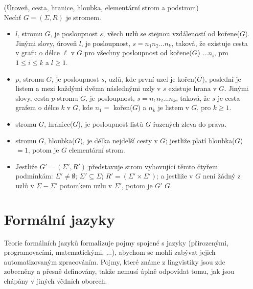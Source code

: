 \begin{defn}
  (Úroveň, cesta, hranice, hloubka, elementární strom a podstrom)\\
  Nechť $G = (\Sigma, R)$ je stromem.
  \begin{itemize}
    \item {} $l$, stromu $G$, je posloupnost $s$,
      všech uzlů se stejnou vzdáleností od kořene($G$).
      Jinými slovy, úroveň $l$, je posloupnost, $s = n_1 n_2 ... n_k$,
      taková, že existuje cesta v grafu o délce $\ell$ v $G$
      pro všechny posloupnost od kořene($G$)
      $ ... n_i$, pro $1 \leq i \leq k$ a $l \geq 1$.

    \item {} $p$, stromu $G$, je posloupnost $s$, uzlů,
      kde první uzel je kořen($G$), poslední je listem a mezi každými
      dvěma následnými uzly v $s$ existuje hrana v $G$.
      Jinými slovy, cesta $p$ stromu $G$, je posloupnost,
      $s = n_1 n_2 ... n_k$, taková, že $s$ je cesta grafem
      o délce $k$ v $G$, kde $n_1 =$ kořen($G$) a $n_k$ je listem
      v $G$, pro $k \geq 1$.

    \item {} stromu $G$, hranice($G$),
      je posloupnost listů $G$ řazených zleva do prava.

    \item {} stromu $G$, hloubka($G$), je délka nejdelší cesty v $G$;
      jestliže platí hloubka($G$)$ = 1$, potom je $G$ elementární strom.

    \item Jestliže $G' = (\Sigma', R')$ představuje strom vyhovující těmto
      čtyřem podmínkám:
      $\Sigma' \neq \emptyset$;
      $\Sigma' \subseteq \Sigma$;
      $R' = (\Sigma' \times \Sigma')$;
      a jestliže v $G$ není žádný z uzlů v $\Sigma - \Sigma'$ potomkem
      uzlu v $\Sigma'$, potom je $G'$  $G$.
  \end{itemize}
  \vspace{-0.5cm}
\end{defn}

\chapter{Formální jazyky}
\label{chap:FormalLangs}

Teorie formálních jazyků formalizuje pojmy spojené s jazyky
(přirozenými, programovacími, matematickými, ...), abychom se mohli zabývat
jejich automatizovaným zpracováním.
Pojmy, které známe z lingvistiky jsou zde zobecněny a přesně definovány,
takže nemusí úplně odpovídat tomu, jak jsou chápány v jiných vědních oborech.

